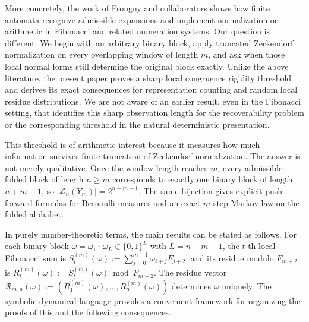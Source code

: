 More concretely, the work of Frougny and collaborators shows how finite automata
recognize admissible expansions and implement normalization or arithmetic in
Fibonacci and related numeration systems.  Our question is different.  We begin
with an arbitrary binary block, apply truncated Zeckendorf normalization on
every overlapping window of length $m$, and ask when those local normal forms
still determine the original block exactly.  Unlike the above literature, the
present paper proves a sharp local congruence rigidity threshold and derives its
exact consequences for representation counting and random local residue
distributions.  We are not aware of an earlier result, even in the Fibonacci
setting, that identifies this sharp observation length for the recoverability
problem or the corresponding threshold in the natural deterministic
presentation.

This threshold is of arithmetic interest because it measures how much
information survives finite truncation of Zeckendorf normalization.  The answer
is not merely qualitative.  Once the window length reaches $m$, every
admissible folded block of length $n\ge m$ corresponds to exactly one binary
block of length $n+m-1$, so
$\lvert\mathcal L_n(Y_m)\rvert=2^{n+m-1}$.  The same bijection gives explicit
push-forward formulas for Bernoulli measures and an exact $m$-step Markov law
on the folded alphabet.

In purely number-theoretic terms, the main results can be stated as follows.
For each binary block $\omega=\omega_1\cdots\omega_L\in\{0,1\}^L$ with
$L=n+m-1$, the $t$-th local Fibonacci sum is
$S_t^{(m)}(\omega):=\sum_{j=0}^{m-1}\omega_{t+j}F_{j+2}$, and its residue
modulo $F_{m+2}$ is
$R_t^{(m)}(\omega):=S_t^{(m)}(\omega)\bmod F_{m+2}$.  The residue vector
$\mathcal R_{m,n}(\omega):=(R_1^{(m)}(\omega),\ldots,R_n^{(m)}(\omega))$
determines $\omega$ uniquely.  The symbolic-dynamical language provides a
convenient framework for organizing the proofs of this and the following
consequences.

